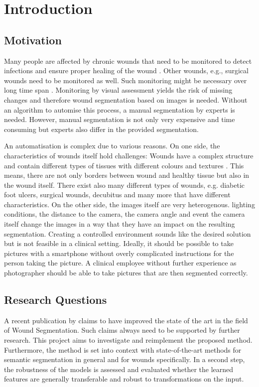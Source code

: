 \section{Introduction}

\subsection{Motivation}

Many people are affected by chronic wounds that need to be monitored to detect infections and ensure proper healing of the wound \cite{DFUC2022}. Other wounds, e.g., surgical wounds need to be monitored as well. Such monitoring might be necessary over long time span \cite{DFUC2022}. Monitoring by visual assessment yields the risk of missing changes and therefore wound segmentation based on images is needed. Without an algorithm to automise this process, a manual segmentation by experts is needed. However, manual segmentation is not only very expensive and time consuming but experts also differ in the provided segmentation.

An automatisation is complex due to various reasons. On one side, the characteristics of wounds itself hold challenges: Wounds have a complex structure and contain different types of tissues with different colours and textures \cite{AhmadFauzi2015}. This means, there are not only borders between wound and healthy tissue but also in the wound itself. There exist also many different types of wounds, e.g. diabetic foot ulcers, surgical wounds, decubitus and many more that have different characteristics. On the other side, the images itself are very heterogenous. lighting conditions, the distance to the camera, the camera angle and event the camera itself change the images in a way that they have an impact on the resulting segmentation. Creating a controlled environment sounds like the desired solution but is not feasible in a clinical setting. Ideally, it should be possible to take pictures with a smartphone without overly complicated instructions for the person taking the picture. A clinical employee without further experience as photographer should be able to take pictures that are then segmented correctly.

\subsection{Research Questions}

A recent publication by \citeauthor{Oota_2023_WACV} claims to have improved the state of the art in the field of Wound Segmentation. Such claims always need to be supported by further research. This project aims to investigate and reimplement the proposed method. Furthermore, the method is set into context with state-of-the-art methods for semantic segmentation in general and for wounds specifically. In a second step, the robustness of the models is assessed and evaluated whether the learned features are generally transferable and robust to transformations on the input.

